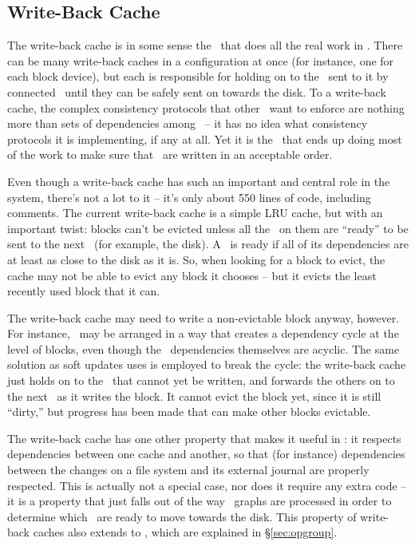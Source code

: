 \subsection{Write-Back Cache}
\label{sec:modules:wbcache}

The write-back cache is in some sense the \module\ that does all the real work
in \Kudos. There can be many write-back caches in a configuration at once (for
instance, one for each block device), but each is responsible for holding on to
the \chdescs\ sent to it by connected \modules\ until they can be safely sent on
towards the disk. To a write-back cache, the complex consistency protocols that
other \modules\ want to enforce are nothing more than sets of dependencies among
\chdescs\ -- it has no idea what consistency protocols it is implementing, if
any at all. Yet it is the \module\ that ends up doing most of the work to make
sure that \chdescs\ are written in an acceptable order.

Even though a write-back cache has such an important and central role in the
system, there's not a lot to it -- it's only about 550 lines of code, including
comments. The current write-back cache is a simple LRU cache, but with an
important twist: blocks can't be evicted unless all the \chdescs\ on them are
``ready'' to be sent to the next \module\ (for example, the disk). A \chdesc\ is
ready if all of its dependencies are at least as close to the disk as it is. So,
when looking for a block to evict, the cache may not be able to evict any block
it chooses -- but it evicts the least recently used block that it can.

The write-back cache may need to write a non-evictable block anyway, however.
For instance, \chdescs\ may be arranged in a way that creates a dependency cycle
at the level of blocks, even though the \chdesc\ dependencies themselves are
acyclic. The same solution as soft updates uses is employed to break the cycle:
the write-back cache just holds on to the \chdescs\ that cannot yet be written,
and forwards the others on to the next \module\ as it writes the block. It
cannot evict the block yet, since it is still ``dirty,'' but progress has been
made that can make other blocks evictable.

The write-back cache has one other property that makes it useful in \Kudos: it
respects dependencies between one cache and another, so that (for instance)
dependencies between the changes on a file system and its external journal are
properly respected. This is actually not a special case, nor does it require any
extra code -- it is a property that just falls out of the way \chdesc\ graphs
are processed in order to determine which \chdescs\ are ready to move towards
the disk. This property of write-back caches also extends to \opgroups, which
are explained in \S\ref{sec:opgroup}.

